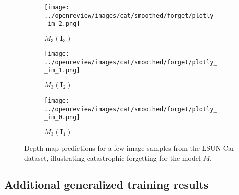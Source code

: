 \begin{figure}[!htb]
\begin{subfigure}{0.33\textwidth}
    \centering
    \texttt{[image: ../openreview/images/cat/smoothed/forget/plotly\_\_im\_2.png]}
    \caption{$M_{3}(\mathbf{I}_{3})$}
    
\end{subfigure}
\begin{subfigure}{0.33\textwidth}
    \centering
    \texttt{[image: ../openreview/images/cat/smoothed/forget/plotly\_\_im\_1.png]}
    \caption{$M_{3}(\mathbf{I}_2)$}
    
\end{subfigure}
\begin{subfigure}{0.33\textwidth}
    \centering
    \texttt{[image: ../openreview/images/cat/smoothed/forget/plotly\_\_im\_0.png]}
    \caption{$M_{3}(\mathbf{I}_1)$}
    
\end{subfigure}
    \caption{Depth map predictions for a few image samples from the LSUN Car dataset, illustrating catastrophic forgetting for the model $M$. }
    \label{fig:forget_cat}
\end{figure}

\newpage

\subsection{Additional generalized training results}

